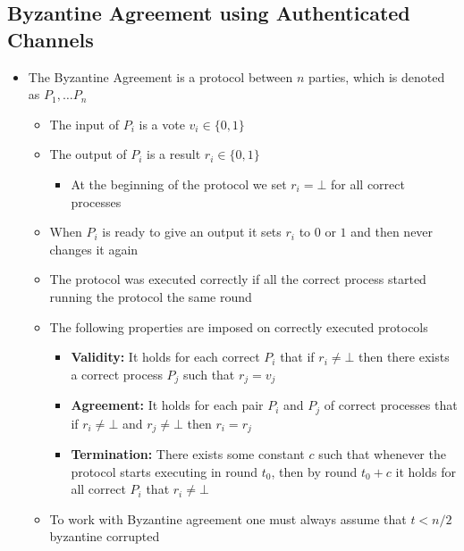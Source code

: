 \documentclass[11pt]{article}
\begin{document}
\subsection{Byzantine Agreement using Authenticated Channels}
\label{sec:orge1fdfc2}
\begin{itemize}
\item The Byzantine Agreement is a protocol between \(n\) parties, which is denoted as \(P_1, \dots P_n\)
\begin{itemize}
\item The input of \(P_i\) is a vote \(v_i \in \{0,1\}\)
\item The output of \(P_i\) is a result \(r_i \in \{0,1\}\)
\begin{itemize}
\item At the beginning of the protocol we set \(r_i = \bot\) for all correct processes
\end{itemize}
\item When \(P_i\) is ready to give an output it sets \(r_i\) to \(0\) or \(1\) and then never changes it again
\item The protocol was executed correctly if all the correct process started running the protocol the same round
\item The following properties are imposed on correctly executed protocols
\begin{itemize}
\item \textbf{Validity:} It holds for each correct \(P_i\) that if \(r_i \ne \bot\) then there exists a correct process \(P_j\) such that \(r_j = v_j\)
\item \textbf{Agreement:} It holds for each pair \(P_i\) and \(P_j\) of correct processes that if \(r_i \ne \bot\) and \(r_j \ne \bot\) then \(r_i = r_j\)
\item \textbf{Termination:} There exists some constant \(c\) such that whenever the protocol starts executing in round \(t_0\), then by round \(t_0 + c\) it holds for all correct \(P_i\) that \(r_i \ne \bot\)
\end{itemize}
\item To work with Byzantine agreement one must always assume that \(t < n/2\)  byzantine corrupted
\end{itemize}
\end{itemize}
\end{document}
